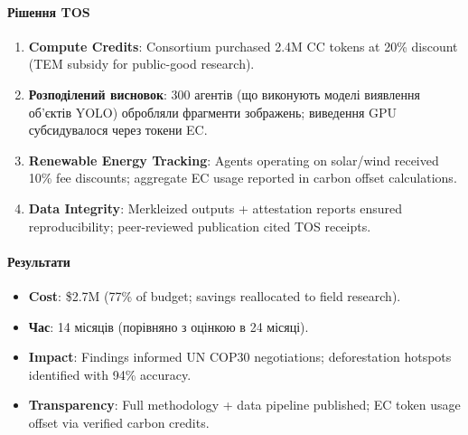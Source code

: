 \documentclass[11pt]{article}
\begin{document}
\paragraph{Рішення TOS}
\begin{enumerate}[noitemsep]
  \item \textbf{Compute Credits}: Consortium purchased 2.4M CC tokens at 20\% discount (TEM subsidy for public-good research).
  \item \textbf{Розподілений висновок}: 300 агентів (що виконують моделі виявлення об'єктів YOLO) обробляли фрагменти зображень; виведення GPU субсидувалося через токени EC.
  \item \textbf{Renewable Energy Tracking}: Agents operating on solar/wind received 10\% fee discounts; aggregate EC usage reported in carbon offset calculations.
  \item \textbf{Data Integrity}: Merkleized outputs + attestation reports ensured reproducibility; peer-reviewed publication cited TOS receipts.
\end{enumerate}

\paragraph{Результати}
\begin{itemize}[noitemsep]
  \item \textbf{Cost}: \$2.7M (77\% of budget; savings reallocated to field research).
  \item \textbf{Час}: 14 місяців (порівняно з оцінкою в 24 місяці).
  \item \textbf{Impact}: Findings informed UN COP30 negotiations; deforestation hotspots identified with 94\% accuracy.
  \item \textbf{Transparency}: Full methodology + data pipeline published; EC token usage offset via verified carbon credits.
\end{itemize}
\end{document}
